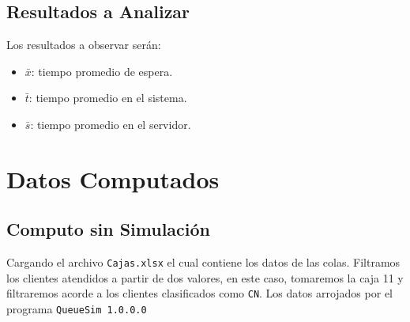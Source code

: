 \documentclass[10pt,letterpaper]{report}
\begin{document}
\subsection*{Resultados a Analizar}
Los resultados a observar serán:
\begin{itemize}
\item $\bar{x}$: tiempo promedio de espera. 
\item $\bar{t}$: tiempo promedio en el sistema. 
\item $\bar{s}$: tiempo promedio en el servidor. 
\end{itemize}
\section*{Datos Computados}
\subsection*{Computo sin Simulación}
Cargando el archivo \texttt{Cajas.xlsx} el cual contiene los datos de las colas. Filtramos los clientes atendidos a partir de dos valores, en este caso, tomaremos la caja 11 y filtraremos acorde a los clientes clasificados como \texttt{CN}. Los datos arrojados por el programa \texttt{QueueSim 1.0.0.0}

\end{document}

